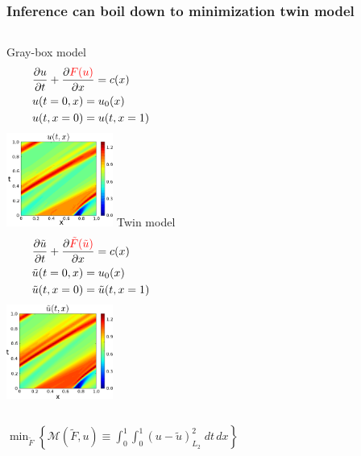 \documentclass{beamer}
\begin{document}
\begin{frame}
    \frametitle{Inference can boil down to minimization \hfill \scriptsize{twin model}}\small
    \begin{columns}
        \centering Gray-box model
        \begin{equation*}\begin{split}
            &\frac{\partial u}{\partial t}+ \frac{\partial \textcolor{red}{F(u)}}{\partial x} = c(x)\\
            &u(t=0,x) = u_0(x)\\
            &u(t,x=0) = u(t, x=1)
        \end{split}\end{equation*}
        \centering
        \includegraphics[width=3.5cm]{imag_1.png} 
        \centering Twin model
        \begin{equation*}\begin{split}
            &\frac{\partial \tilde{u}}{\partial t}+ \frac{\partial {\textcolor{red}{\tilde{F}
             (\tilde{u})}}}{\partial x} = c(x)\\
            &\tilde{u}(t=0,x) = u_0(x)\\
            &\tilde{u}(t,x=0) = \tilde{u}(t, x=1)
        \end{split}\end{equation*}
        \centering
        \includegraphics[width=3.5cm]{imag_2.png}
    \end{columns}
    \begin{center}
    \normalsize
    $
        \min_{\tilde{F}}\left\{ \mathcal{M}(\tilde{F}, u) \equiv \int_0^1\int_0^1\left(u-\tilde{u}\right)^2_{L_2}\; dt\,dx \right\}
    $
    \end{center}
\end{frame}
\end{document}
